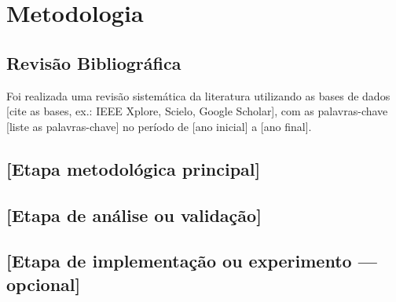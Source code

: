 \section{Metodologia}\label{sec:metodologia}


\subsection{Revisão Bibliográfica}


Foi realizada uma revisão sistemática da literatura utilizando as bases de dados
[cite as bases, ex.: IEEE Xplore, Scielo, Google Scholar], com as palavras-chave
[liste as palavras-chave] no período de [ano inicial] a [ano final].

\subsection{[Etapa metodológica principal]}


\subsection{[Etapa de análise ou validação]}


\subsection{[Etapa de implementação ou experimento — opcional]}

